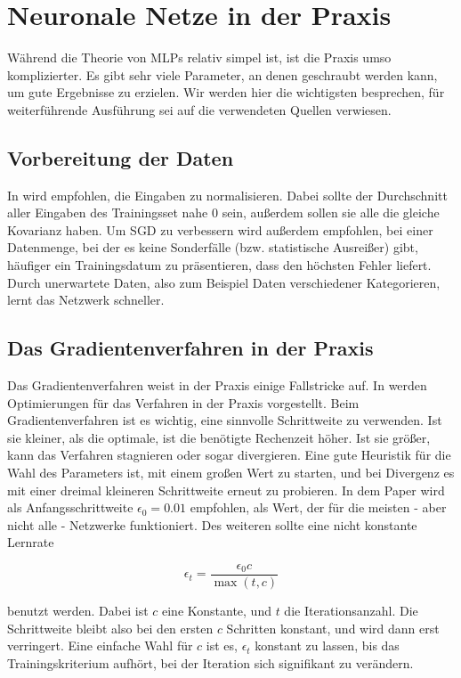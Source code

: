 \section{Neuronale Netze in der Praxis}
Während die Theorie von MLPs relativ simpel ist, ist die Praxis umso komplizierter. Es gibt sehr viele Parameter, an denen geschraubt werden kann, um gute Ergebnisse zu erzielen. Wir werden hier die wichtigsten besprechen, für weiterführende Ausführung sei auf die verwendeten Quellen verwiesen. 

\subsection{Vorbereitung der Daten}
In \cite{lecunefficient} wird empfohlen, die Eingaben zu normalisieren.
Dabei sollte der Durchschnitt aller Eingaben des Trainingsset nahe $0$ sein, außerdem sollen sie alle die gleiche Kovarianz haben.
Um SGD zu verbessern wird außerdem empfohlen, bei einer Datenmenge, bei der es keine Sonderfälle (bzw. statistische Ausreißer) gibt, häufiger ein Trainingsdatum zu präsentieren, dass den höchsten Fehler liefert. Durch unerwartete Daten, also zum Beispiel Daten verschiedener Kategorieren, lernt das Netzwerk schneller.

\subsection{Das Gradientenverfahren in der Praxis}
Das Gradientenverfahren weist in der Praxis einige Fallstricke auf. In \cite{bengio2012practical} werden Optimierungen für das Verfahren in der Praxis vorgestellt. 
Beim Gradientenverfahren ist es wichtig, eine sinnvolle Schrittweite zu verwenden. Ist sie kleiner, als die optimale, ist die benötigte Rechenzeit höher. Ist sie größer, kann das Verfahren stagnieren oder sogar divergieren. Eine gute Heuristik für die Wahl des Parameters ist, mit einem großen Wert zu starten, und bei Divergenz es mit einer dreimal kleineren Schrittweite erneut zu probieren.
In dem Paper wird als Anfangsschrittweite $\epsilon_0 = 0.01$ empfohlen, als Wert, der für die meisten - aber nicht alle - Netzwerke funktioniert.
Des weiteren sollte eine nicht konstante Lernrate 

\begin{equation}
	\epsilon_t = \frac{\epsilon_0 c}{\max(t, c)}
\end{equation}

benutzt werden. Dabei ist $c$ eine Konstante, und $t$ die Iterationsanzahl. Die Schrittweite bleibt also bei den ersten $c$ Schritten konstant, und wird dann erst verringert. Eine einfache Wahl für $c$ ist es, $\epsilon_t$ konstant zu lassen, bis das Trainingskriterium aufhört, bei der Iteration sich signifikant zu verändern.


